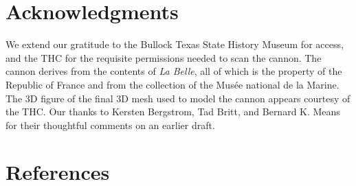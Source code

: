 \documentclass[review]{elsarticle}
\begin{document}
\section*{Acknowledgments}

We extend our gratitude to the Bullock Texas State History Museum for access, and the THC for the requisite permissions needed to scan the cannon. The cannon derives from the contents of \textit{La Belle}, all of which is the property of the Republic of France and from the collection of the Musée national de la Marine. The 3D figure of the final 3D mesh used to model the cannon appears courtesy of the THC. Our thanks to Kersten Bergstrom, Tad Britt, and Bernard K. Means for their thoughtful comments on an earlier draft.

\section*{References}



\end{document}
